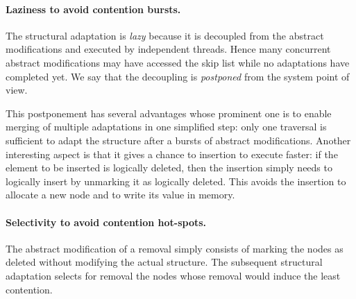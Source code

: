 \paragraph{Laziness to avoid contention bursts.}
The structural adaptation is \emph{lazy} because it is decoupled from the abstract modifications and 
executed by independent threads. 
Hence many concurrent abstract modifications may have accessed the skip list 
while no adaptations have completed yet. We say that the 
decoupling is \emph{postponed} from the system point of view.

This postponement has several advantages whose prominent one is to enable merging of multiple
adaptations in one simplified step: only one traversal is sufficient to adapt the structure after a bursts 
of abstract modifications.
Another interesting aspect is that it gives a chance to insertion to execute faster: if the element 
to be inserted is logically deleted, then the insertion simply needs to logically insert by 
unmarking it as logically deleted. This avoids the insertion to allocate a new node and to write its 
value in memory.

\paragraph{Selectivity to avoid contention hot-spots.}
The abstract modification of a removal simply consists of marking the nodes 
as deleted without modifying the actual structure.
The subsequent structural adaptation %
selects for removal the nodes whose removal 
would induce the least contention. %

